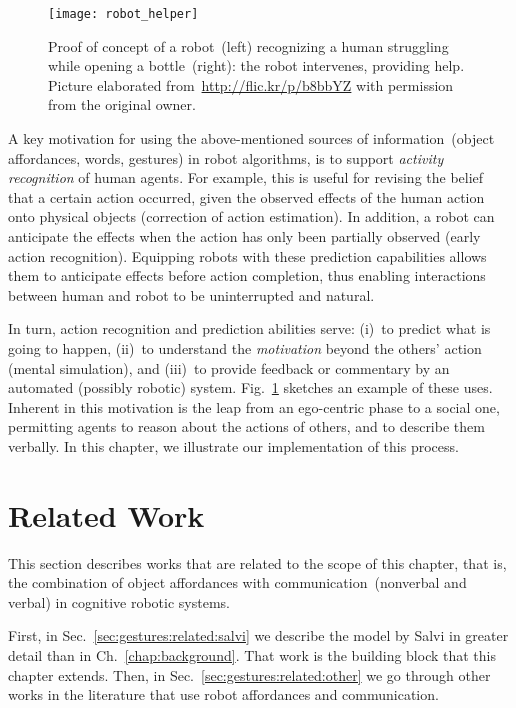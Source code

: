 \begin{figure}
\centering
\texttt{[image: robot\_helper]}
\caption[Proof of concept of a robot recognizing a human struggling while opening a bottle: the robot intervenes, providing help.]{Proof of concept of a robot~(left) recognizing a human struggling while opening a bottle~(right): the robot intervenes, providing help.
Picture elaborated from~\url{http://flic.kr/p/b8bbYZ} with permission from the original owner.}
\label{fig:robot_helper}
\end{figure}

A key motivation for using the above-mentioned sources of information~(object affordances, words, gestures) in robot algorithms, is to support \emph{activity recognition} of human agents.
For example, this is useful for revising the belief that a certain action occurred, given the observed effects of the human action onto physical objects (correction of action estimation).
In addition, a robot can anticipate the effects when the action has only been partially observed (early action recognition).
Equipping robots with these prediction capabilities allows them to anticipate effects before action completion, thus enabling interactions between human and robot to be uninterrupted and natural.

In turn, action recognition and prediction abilities serve:
(i)~to predict what is going to happen,
(ii)~to understand the \emph{motivation} beyond the others' action (mental simulation), and
(iii)~to provide feedback or commentary by an automated (possibly robotic) system.
Fig.~\ref{fig:robot_helper} sketches an example of these uses.
Inherent in this motivation is the leap from an ego-centric phase to a social one, permitting agents to reason about the actions of others, and to describe them verbally.
In this chapter, we illustrate our implementation of this process.

\section{Related Work}
\label{sec:gestures:related}

This section describes works that are related to the scope of this chapter, that is, the combination of object affordances with communication~(nonverbal and verbal) in cognitive robotic systems.

First, in Sec.~\ref{sec:gestures:related:salvi} we describe the model by Salvi in greater detail than in Ch.~\ref{chap:background}.
That work is the building block that this chapter extends.
Then, in Sec.~\ref{sec:gestures:related:other} we go through other works in the literature that use robot affordances and communication.

